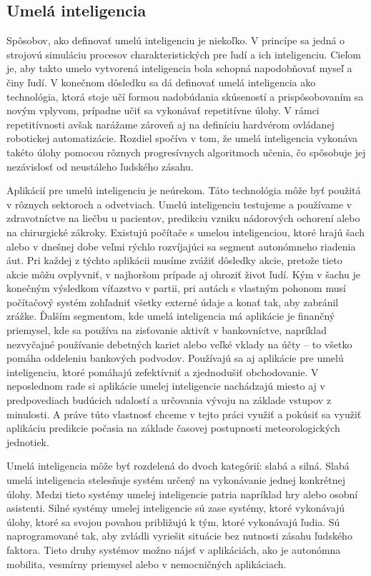 \subsection{Umelá inteligencia}
Spôsobov, ako definovať umelú inteligenciu je niekoľko. V princípe sa jedná o strojovú simuláciu procesov charakteristických pre ľudí a ich inteligenciu. Cieľom je, aby takto umelo vytvorená inteligencia bola schopná napodobňovať myseľ a činy ľudí. V konečnom dôsledku sa dá definovať umelá inteligencia ako technológia, ktorá stoje učí formou nadobúdania skúseností a prispôsobovaním sa novým vplyvom, prípadne učiť sa vykonávať repetitívne úlohy. V rámci repetitívnosti avšak narážame zároveň aj na definíciu hardvérom ovládanej robotickej automatizácie. Rozdiel spočíva v tom, že umelá inteligencia vykonáva takéto úlohy pomocou rôznych progresívnych algoritmoch učenia, čo spôsobuje jej nezávislosť od neustáleho ľudského zásahu.

Aplikácií pre umelú inteligenciu je neúrekom. Táto technológia môže byť použitá v rôznych sektoroch a odvetviach. Umelú inteligenciu testujeme a používame v zdravotníctve na liečbu u pacientov, predikciu vzniku nádorových ochorení alebo na chirurgické zákroky. Existujú počítače s umelou inteligenciou, ktoré hrajú šach alebo v dnešnej dobe veľmi rýchlo rozvíjajúci sa segment autonómneho riadenia áut. Pri každej z týchto aplikácii musíme zvážiť dôsledky akcie, pretože tieto akcie môžu ovplyvniť, v najhoršom prípade aj ohroziť život ľudí. Kým v šachu je konečným výsledkom víťazstvo v partii, pri autách s vlastným pohonom musí počítačový systém zohľadniť všetky externé údaje a konať tak, aby zabránil zrážke. Ďalším segmentom, kde umelá inteligencia má aplikácie je finančný priemysel, kde sa používa na zisťovanie aktivít v bankovníctve, napríklad nezvyčajné používanie debetných kariet alebo veľké vklady na účty – to všetko pomáha oddeleniu bankových podvodov. Používajú sa aj aplikácie pre umelú inteligenciu, ktoré pomáhajú zefektívniť a zjednodušiť obchodovanie. V neposlednom rade si aplikácie umelej inteligencie nachádzajú miesto aj v predpovediach budúcich udalostí a určovania vývoju na základe vstupov z minulosti. A práve túto vlastnosť chceme v tejto práci využiť a pokúsiť sa využiť aplikáciu predikcie počasia na základe časovej postupnosti meteorologických jednotiek.

Umelá inteligencia môže byť rozdelená do dvoch kategórií: slabá a silná. Slabá umelá inteligencia stelesňuje systém určený na vykonávanie jednej konkrétnej úlohy. Medzi tieto systémy umelej inteligencie patria napríklad hry alebo osobní asistenti. Silné systémy umelej inteligencie sú zase systémy, ktoré vykonávajú úlohy, ktoré sa svojou povahou približujú k tým, ktoré vykonávajú ľudia. Sú naprogramované tak, aby zvládli vyriešit situácie bez nutnosti zásahu ľudského faktora. Tieto druhy systémov možno nájsť v aplikáciách, ako je autonómna mobilita, vesmírny priemysel alebo v nemocničných aplikáciach.

